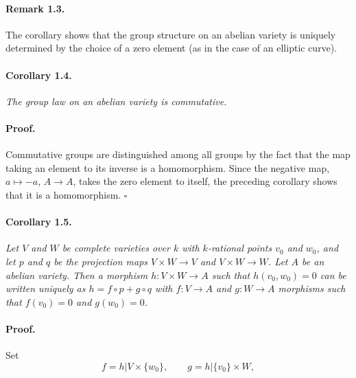 \paragraph{Remark 1.3.}
The corollary shows that the group structure on an abelian variety is
uniquely determined by the choice of a zero element (as in the case of an
elliptic curve).

\paragraph{Corollary 1.4.}
\textit{The group law on an abelian variety is commutative.}

\paragraph{Proof.}
Commutative groups are distinguished among all groups by the fact that the
map taking an element to its inverse is a homomorphism. Since the negative
map, $a \mapsto -a$, $A \to A$, takes the zero element to itself, the
preceding corollary shows that it is a homomorphism. \hfill $\square$

\paragraph{Corollary 1.5.}
\textit{Let $V$ and $W$ be complete varieties over $k$ with $k$-rational
points $v_0$ and $w_0$, and let $p$ and $q$ be the projection maps
$V \times W \to V$ and $V \times W \to W$. Let $A$ be an abelian variety.
Then a morphism $h : V \times W \to A$ such that $h(v_0, w_0) = 0$ can be
written uniquely as $h = f \circ p + g \circ q$ with $f : V \to A$ and
$g : W \to A$ morphisms such that $f(v_0) = 0$ and $g(w_0) = 0$.}

\paragraph{Proof.}
Set
\[
  f = h | V \times \{w_0\}, \qquad g = h | \{v_0\} \times W,
\]
